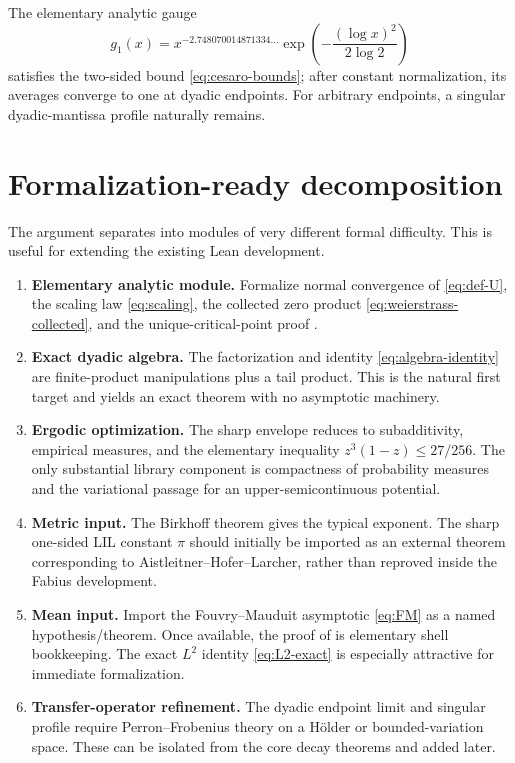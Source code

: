 \documentclass[11pt,oneside]{article}
\theoremstyle{definition}
\theoremstyle{remark}
\begin{document}
The elementary analytic gauge
\[
 g_1(x)=x^{-2.748070014871334\ldots}
 \exp\!\left(-\frac{(\log x)^2}{2\log2}\right)
\]
satisfies the two-sided bound \eqref{eq:cesaro-bounds}; after constant normalization,
its averages converge to one at dyadic endpoints.  For arbitrary endpoints, a singular
dyadic-mantissa profile naturally remains.

\section{Formalization-ready decomposition}\label{sec:formalization}

The argument separates into modules of very different formal difficulty.  This is useful
for extending the existing Lean development.

\begin{enumerate}
\item \textbf{Elementary analytic module.}
Formalize normal convergence of \eqref{eq:def-U}, the scaling law
\eqref{eq:scaling}, the collected zero product \eqref{eq:weierstrass-collected}, and the
unique-critical-point proof .

\item \textbf{Exact dyadic algebra.}
The factorization  and identity
\eqref{eq:algebra-identity} are finite-product manipulations plus a tail product.  This
is the natural first target and yields an exact theorem with no asymptotic machinery.

\item \textbf{Ergodic optimization.}
The sharp envelope reduces to subadditivity, empirical measures, and the elementary
inequality $z^3(1-z)\le27/256$.  The only substantial library component is compactness of
probability measures and the variational passage for an upper-semicontinuous potential.

\item \textbf{Metric input.}
The Birkhoff theorem gives the typical exponent.  The sharp one-sided LIL constant $\pi$ should
initially be imported as an external theorem corresponding to Aistleitner--Hofer--Larcher,
rather than reproved inside the Fabius development.

\item \textbf{Mean input.}
Import the Fouvry--Mauduit asymptotic \eqref{eq:FM} as a named hypothesis/theorem.
Once available, the proof of  is elementary shell bookkeeping.
The exact $L^2$ identity \eqref{eq:L2-exact} is especially attractive for immediate
formalization.

\item \textbf{Transfer-operator refinement.}
The dyadic endpoint limit and singular profile require Perron--Frobenius theory on a
H\"older or bounded-variation space.  These can be isolated from the core decay theorems
and added later.
\end{enumerate}
\end{document}
